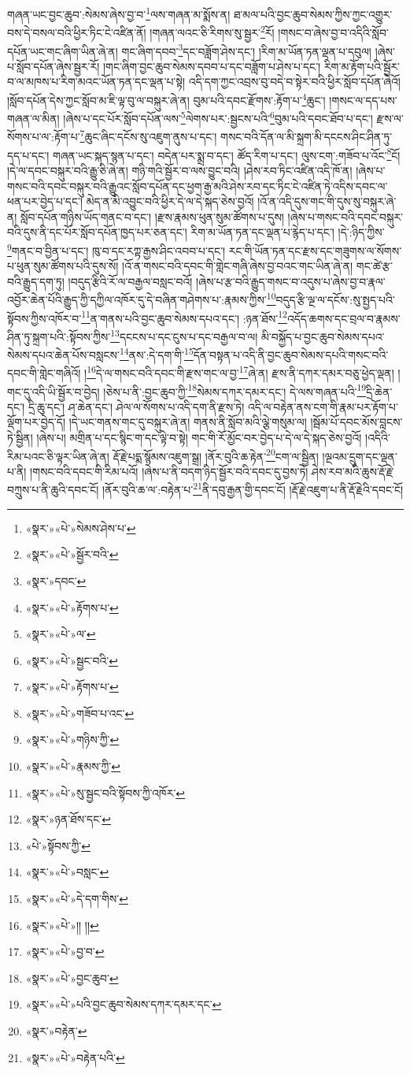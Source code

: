 གཞན་ཡང་བྱང་ཆུབ་:སེམས་ཞེས་བྱ་བ་\footnote{«སྣར་»«པེ་»སེམས་ཤེས་པ་}ལས་གཞན་མ་སྨོས་ན། ཐ་མལ་པའི་བྱང་ཆུབ་སེམས་ཀྱིས་ཀྱང་འགྱུར་བས་དེ་བསལ་བའི་ཕྱིར་ཏིང་ངེ་འཛིན་ནོ། །གཞན་ལའང་ཅི་རིགས་སུ་སྦྱར་\footnote{«སྣར་»«པེ་»སྦྱོར་བའི་}རོ། །གསང་བ་ཞེས་བྱ་བ་འདིའི་སློབ་དཔོན་ཡང་གང་ཞིག་ཡིན་ཞེ་ན། གང་ཞིག་དབབ་\footnote{«སྣར་»དབང་}དང་བཟློག་ཤེས་དང་། །རིག་མ་ཡོན་ཏན་ལྡན་པ་དབུལ། །ཞེས་པ་སློབ་དཔོན་ཞེས་སྦྱར་རོ། །གང་ཞིག་བྱང་ཆུབ་སེམས་དབབ་པ་དང་བཟློག་པ་ཤེས་པ་དང་། རིག་མ་རྟོག་པའི་སྦྱོར་བ་ལ་མཁས་པ་རིག་མའང་ཡོན་ཏན་དང་ལྡན་པ་སྟེ། འདི་དག་ཀྱང་འབྲས་བུ་བདེ་བ་སྟེར་བའི་ཕྱིར་སློབ་དཔོན་ཞེའོ། །སློབ་དཔོན་དེས་ཀྱང་སློབ་མ་ཇི་ལྟ་བུ་ལ་བསྐུར་ཞེ་ན། བུམ་པའི་དབང་རྫོགས་:རྟོག་པ་\footnote{«སྣར་»«པེ་»རྟོགས་པ་}ཆུང་། །གསང་ལ་དད་པས་གཞན་ལ་མིན། །ཞེས་པ་དང་པོར་སློབ་དཔོན་ལས་\footnote{«སྣར་»«པེ་»ལ་}ལེགས་པར་:སྦྱངས་པའི་\footnote{«སྣར་»«པེ་»སྦྱང་བའི་}བུམ་པའི་དབང་ཐོབ་པ་དང་། རྫས་ལ་སོགས་པ་ལ་:རྟོག་པ་\footnote{«སྣར་»«པེ་»རྟོགས་པ་}ཆུང་ཞིང་དངོས་སུ་འཇུག་ནུས་པ་དང་། གསང་བའི་དོན་ལ་མི་སྐྲག་མི་དངངས་ཤིང་ཤིན་ཏུ་དད་པ་དང་། གཞན་ཡང་སྐད་སྙན་པ་དང་། བདེན་པར་སྨྲ་བ་དང་། ཚོད་རིག་པ་དང་། ལུས་ངག་:གཟོབ་པ་འོང་\footnote{«སྣར་»«པེ་»གཟོབ་པ་འང་}ངོ། །དེ་ལ་དབང་བསྐུར་བའི་རྒྱུ་ཅི་ཞེ་ན། གཉི་གའི་སྦྱོར་བ་ལས་བྱུང་བའི། །ཤེས་རབ་ཏིང་འཛིན་འདི་ཁོ་ན། །ཞེས་པ་གསང་བའི་དབང་བསྐུར་བའི་རྒྱུའང་སློབ་དཔོན་དང་ཕྱག་རྒྱ་མའི་ཤེས་རབ་དང་ཏིང་ངེ་འཛིན་ཏེ་འདིས་དབང་ལ་ཕན་པར་བྱེད་པ་དང་། མེད་ན་མི་འབྱུང་བའི་ཕྱིར་དེ་ལ་དེ་སྐད་ཅེས་བྱའོ། །འོ་ན་འདི་དུས་གང་གི་དུས་སུ་བསྐུར་ཞེ་ན། སློབ་དཔོན་གཉིས་ཡོད་གནང་བ་དང་། །རྫས་རྣམས་ཕུན་སུམ་ཚོགས་པ་དུས། །ཞེས་པ་གསང་བའི་དབང་བསྐུར་བའི་དུས་ནི་དང་པོར་སློབ་དཔོན་ཁྱད་པར་ཅན་དང་། རིག་མ་ཡོན་ཏན་དང་ལྡན་པ་རྙེད་པ་དང་། །དེ་:ཉིད་ཀྱིས་\footnote{«སྣར་»«པེ་»གཉིས་ཀྱི་}གནང་བ་བྱིན་པ་དང་། ཁུ་བ་དང་རཀྟ་རྒྱས་ཤིང་འབབ་པ་དང་། རང་གི་ཡོན་ཏན་དང་རྫས་དང་གཟུགས་ལ་སོགས་པ་ཕུན་སུམ་ཚོགས་པའི་དུས་སོ། །འོ་ན་གསང་བའི་དབང་གི་གླེང་གཞི་ཞེས་བྱ་བའང་གང་ཡིན་ཞེ་ན། གང་ཚེ་རྩ་བའི་རྒྱུད་དག་ཏུ། །བདུད་རྩིའི་རོ་ལ་བརྒྱལ་བསླང་བའོ། །ཞེས་པ་རྩ་བའི་རྒྱུད་གསང་བ་འདུས་པ་ཞེས་བྱ་བ་རྣལ་འབྱོར་ཆེན་པོའི་རྒྱུད་ཀྱི་དཀྱིལ་འཁོར་དུ་དེ་བཞིན་གཤེགས་པ་:རྣམས་ཀྱིས་\footnote{«སྣར་»«པེ་»རྣམས་ཀྱི་}བདུད་རྩི་ལྔ་ལ་དངོས་:སུ་སྤྱད་པའི་སྟོབས་ཀྱིས་འཁོར་བ་\footnote{«སྣར་»«པེ་»སུ་སྦྱང་བའི་སྟོབས་ཀྱི་འཁོར་}ན་གནས་པའི་བྱང་ཆུབ་སེམས་དཔའ་དང་། :ཉན་ཐོས་\footnote{«སྣར་»ཉན་ཐོས་དང་}འདོད་ཆགས་དང་བྲལ་བ་རྣམས་ཤིན་ཏུ་སྐྲག་པའི་:སྟོབས་ཀྱིས་\footnote{«པེ་»སྟོབས་ཀྱི་}དངངས་པ་དང་ངུས་པ་དང་བརྒྱལ་བ་ལ། མི་བསྐྱོད་པ་བྱང་ཆུབ་སེམས་དཔའ་སེམས་དཔའ་ཆེན་པོས་བསླངས་\footnote{«སྣར་»«པེ་»བསླང་}ནས་:དེ་དག་གི་\footnote{«སྣར་»«པེ་»དེ་དག་གིས་}དོན་བསྟན་པ་འདི་ནི་བྱང་ཆུབ་སེམས་དཔའི་གསང་བའི་དབང་གི་གླེང་གཞིའོ། །\footnote{«སྣར་»«པེ་»།། །།}དེ་ལ་གསང་བའི་དབང་གི་རྫས་གང་ལ་བྱ་\footnote{«སྣར་»«པེ་»བྱ་བ་}ཞེ་ན། རྫས་ནི་དཀར་དམར་བཅུ་ཕྱེད་ལྡན། །གང་དུ་འདི་ཡི་སྦྱོར་བ་བྱེད། །ཅེས་པ་ནི་:བྱང་ཆུབ་ཀྱི་\footnote{«སྣར་»«པེ་»བྱང་ཆུབ་}སེམས་དཀར་དམར་དང་། དེ་ལས་གཞན་པའི་\footnote{«སྣར་»«པེ་»པའི་བྱང་ཆུབ་སེམས་དཀར་དམར་དང་}དྲི་ཆེན་དང་། དྲི་ཆུ་དང་། ཤ་ཆེན་དང་། ཤེལ་ལ་སོགས་པ་འདི་དག་ནི་རྫས་ཏེ། འདི་ལ་བརྟེན་ནས་ངག་གི་རྣམ་པར་རྟོག་པ་ལྡོག་པར་བྱེད་དོ། །དེ་ཡང་གནས་གང་དུ་བསྐུར་ཞེ་ན། གནས་ནི་སློབ་མའི་ལྕེ་གསུམ་ལ། །སྦོམ་པོ་དབང་མོས་བླངས་ཏེ་སྦྱིན། །ཞེས་པ། མགྲིན་པ་དང་སྙིང་ག་དང་ལྟེ་བ་སྟེ། གང་གི་རོ་མྱོང་བར་བྱེད་པ་དེ་ལ་དེ་སྐད་ཅེས་བྱའོ། །འདིའི་རིམ་པའང་ཅི་ལྟར་ཡིན་ཞེ་ན། རྡོ་རྗེ་པདྨ་སྙོམས་འཇུག་སྒྲ། །ནོར་བུའི་ཆ་རྟེན་\footnote{«སྣར་»བརྟེན་}ངག་ལ་སྦྱིན། །ལྔའམ་དྲུག་དང་ལྡན་པ་ནི། །གསང་བའི་དབང་གི་རིམ་པའོ། །ཞེས་པ་ནི་བདག་ཉིད་སྦྱོར་བའི་དབང་དུ་བྱས་ཏེ། ཤེས་རབ་མའི་ཆུས་རྡོ་རྗེ་བཀྲུས་པ་ནི་ཆུའི་དབང་ངོ། །ནོར་བུའི་ཆ་ལ་:བརྟེན་པ་\footnote{«སྣར་»«པེ་»བརྟེན་པའི་}ནི་དབུ་རྒྱན་གྱི་དབང་ངོ། །རྡོ་རྗེ་འཇུག་པ་ནི་རྡོ་རྗེའི་དབང་ངོ། 